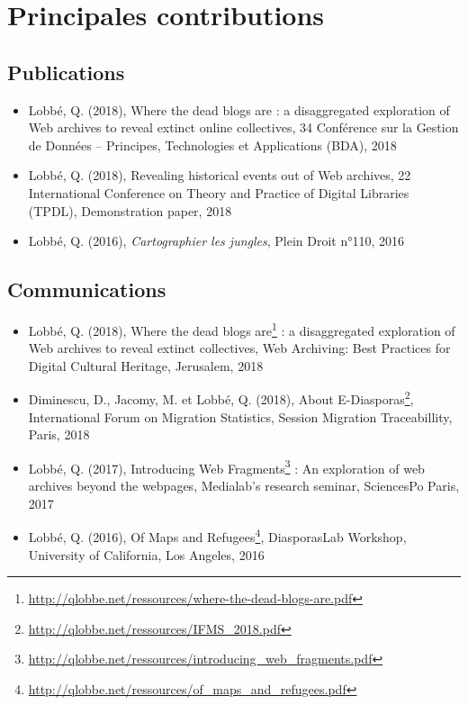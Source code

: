 \documentclass[symmetric,justified,marginals=raggedouter]{tufte-book}
\begin{document}
\newpage

\section*{Principales contributions}
\label{sec:1_contributions}

\subsection{Publications}

\begin{itemize}[leftmargin=*]  
\item Lobbé, Q. (2018), Where the dead blogs are : a disaggregated exploration of Web archives to reveal extinct online collectives, 34\ieme{} Conférence sur la Gestion de Données – Principes, Technologies et Applications (BDA), 2018
\item Lobbé, Q. (2018), Revealing historical events out of Web archives, 22\ieme{} International Conference on Theory and Practice of Digital Libraries (TPDL), Demonstration paper, 2018
\item Lobbé, Q. (2016), \textit{Cartographier les jungles}, Plein Droit n°110, 2016
\end{itemize}

\subsection{Communications}

\begin{itemize}[leftmargin=*] 
\item Lobbé, Q. (2018), Where the dead blogs are\footnote{\RaggedOuter \url{http://qlobbe.net/ressources/where-the-dead-blogs-are.pdf}} : a disaggregated exploration of Web archives to reveal extinct collectives, Web Archiving: Best Practices for Digital Cultural Heritage, Jerusalem, 2018 
\item Diminescu, D., Jacomy, M. et Lobbé, Q. (2018), About E-Diasporas\footnote{\RaggedOuter \url{http://qlobbe.net/ressources/IFMS\_2018.pdf}}, International Forum on Migration Statistics, Session Migration Traceabillity, Paris, 2018
\item Lobbé, Q. (2017), Introducing Web Fragments\footnote{\RaggedOuter \url{http://qlobbe.net/ressources/introducing\_web\_fragments.pdf}} : An exploration of web archives beyond the webpages, Medialab’s research seminar, SciencesPo Paris, 2017
\item Lobbé, Q. (2016), Of Maps and Refugees\footnote{\RaggedOuter \url{http://qlobbe.net/ressources/of\_maps\_and\_refugees.pdf}}, DiasporasLab Workshop, University of California, Los Angeles, 2016
\end{itemize}
\end{document}
